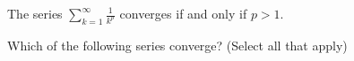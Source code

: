 \documentclass{ximera}
\begin{document}
\begin{theorem}
 The series $\sum_{k=1}^\infty \frac{1}{k^p}$ converges if and only if $p > 1$.
 \end{theorem}

\begin{question}
Which of the following series converge? (Select all that apply)

\begin{selectAll}
\end{selectAll}
\end{question}
\end{document}

